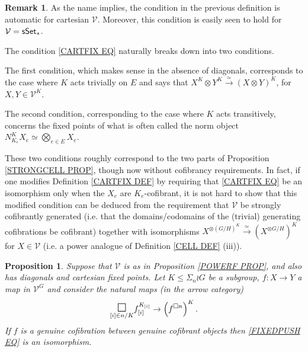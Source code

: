 \documentclass[a4paper,10pt
,draft
]{article}%
\numberwithin{equation}{section}
\numberwithin{figure}{section}
\newtheorem{proposition}[equation]{Proposition}%
\theoremstyle{definition} %
\newtheorem{remark}[equation]{Remark}%
\newcommand{\1}{\ensuremath{\mathbbm 1}}%
\begin{document}
\begin{remark}
As the name implies, the condition in the previous definition is automatic for cartesian 
$\mathcal{V}$. Moreover, this condition is easily seen to hold for $\mathcal{V} = \mathsf{sSet}_{\**}$.

The condition \eqref{CARTFIX EQ} naturally breaks down into two conditions.

The first condition, which makes sense in the absence of diagonals, corresponds to the case where $K$ acts trivially on $E$ and says that
$X^K \otimes Y^K \xrightarrow{\simeq} (X \otimes Y)^K$, for $X,Y \in \mathcal{V}^K$.

The second condition, corresponding to the case where $K$ acts transitively, 
concerns the fixed points of what is often called the norm object
$N_{K_e}^K X_e \simeq \bigotimes_{e \in E} X_e$.

These two conditions roughly correspond 
to the two parts of Proposition \ref{STRONGCELL PROP},
though now without cofibrancy requirements.
In fact, if one modifies
Definition \ref{CARTFIX DEF} 
by requiring that
\eqref{CARTFIX EQ}
be an isomorphism only when the
$X_e$ are $K_e$-cofibrant,
it is not hard to show that
this modified condition can be deduced from
the requirement that $\mathcal{V}$ be strongly
cofibrantly generated (i.e. that the domains/codomains of the (trivial) generating cofibrations be cofibrant)
together with
isomorphisms
$X^{\otimes (G/H)^K} \xrightarrow{\simeq} 
\left( X^{\otimes G/H} \right)^K$
for $X \in \mathcal{V}$
(i.e. a power analogue of 
Definition \ref{CELL DEF} (iii)).
\end{remark}


\begin{proposition}\label{FIXEDPUSH PROP}
	Suppose that $\mathcal{V}$ is as in Proposition \ref{POWERF PROP},
	and also has diagonals and cartesian fixed points.
	Let $K \leq \Sigma_n \wr G$ be a subgroup, 
	$f \colon X \to Y$ a map in $\mathcal{V}^G$ and consider the natural maps (in the arrow category)
\begin{equation}\label{FIXEDPUSH EQ}
	\underset{[i] \in n/K}{\mathlarger{\mathlarger{\square}}}
	f_{[i]}^{K_{[i]}}
\to
	\left( f^{\square n} \right)^K.
\end{equation}
If $f$ is a genuine cofibration between genuine cofibrant objects then 
\eqref{FIXEDPUSH EQ} is an isomorphism.
\end{proposition}
\end{document}
